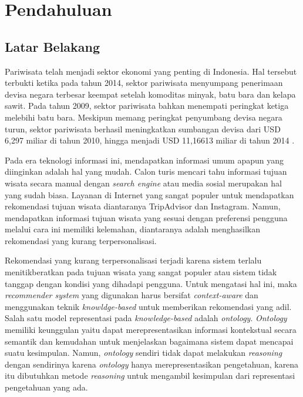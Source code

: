 \chapter{Pendahuluan}
\section{Latar Belakang}

Pariwisata telah menjadi sektor ekonomi yang penting di Indonesia. Hal tersebut terbukti ketika pada tahun 2014, sektor pariwisata menyumpang penerimaan devisa negara terbesar
keempat setelah komoditas minyak, batu bara dan kelapa sawit. Pada tahun 2009, sektor pariwisata bahkan menempati peringkat ketiga melebihi batu bara\cite{bps1}. Meskipun memang peringkat penyumbang devisa negara turun, sektor pariwisata berhasil meningkatkan sumbangan devisa dari USD 6,297 miliar di tahun 2010, hingga menjadi USD 11,16613 miliar di tahun 2014 \cite{bps2}.
\par
Pada era teknologi informasi ini, mendapatkan informasi umum apapun yang diinginkan adalah hal yang mudah. Calon turis mencari tahu informasi tujuan wisata secara manual dengan \textit{search engine} atau media sosial merupakan hal yang sudah biasa. Layanan di Internet yang sangat populer untuk mendapatkan rekomendasi tujuan wisata diantaranya TripAdvisor dan Instagram. Namun, mendapatkan informasi tujuan wisata yang sesuai dengan preferensi pengguna melalui cara ini memiliki kelemahan, diantaranya adalah menghasilkan rekomendasi yang kurang terpersonalisasi.
\par 
Rekomendasi yang kurang terpersonalisasi terjadi karena sistem terlalu menitikberatkan pada tujuan wisata yang sangat populer atau sistem tidak tanggap dengan kondisi yang dihadapi pengguna. Untuk mengatasi hal ini, maka \textit{recommender system} yang digunakan harus bersifat \textit{context-aware}\cite{alhazbi2013} dan menggunakan teknik \textit{knowldge-based} untuk memberikan rekomendasi yang adil. Salah satu model representasi pada \textit{knowledge-based} adalah \textit{ontology}. \textit{Ontology} memiliki keunggulan yaitu dapat merepresentasikan informasi kontekstual secara semantik dan kemudahan untuk menjelaskan bagaimana sistem dapat mencapai suatu kesimpulan. Namun, \textit{ontology} sendiri tidak dapat melakukan \textit{reasoning} dengan sendirinya karena \textit{ontology} hanya merepresentasikan pengetahuan, karena itu dibutuhkan metode \textit{reasoning} untuk mengambil kesimpulan dari representasi pengetahuan yang ada.
\par
